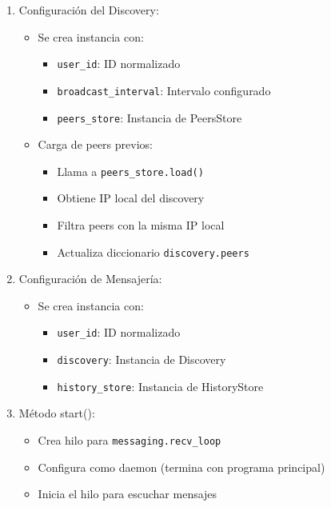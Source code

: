 \documentclass[12pt]{article}
\begin{document}
\begin{enumerate}
    \item Configuración del Discovery:
    \begin{itemize}
        \item Se crea instancia con:
        \begin{itemize}
            \item \texttt{user\_id}: ID normalizado
            \item \texttt{broadcast\_interval}: Intervalo configurado
            \item \texttt{peers\_store}: Instancia de PeersStore
        \end{itemize}
        \item Carga de peers previos:
        \begin{itemize}
            \item Llama a \texttt{peers\_store.load()}
            \item Obtiene IP local del discovery
            \item Filtra peers con la misma IP local
            \item Actualiza diccionario \texttt{discovery.peers}
        \end{itemize}
    \end{itemize}

    \item Configuración de Mensajería:
    \begin{itemize}
        \item Se crea instancia con:
        \begin{itemize}
            \item \texttt{user\_id}: ID normalizado
            \item \texttt{discovery}: Instancia de Discovery
            \item \texttt{history\_store}: Instancia de HistoryStore
        \end{itemize}
    \end{itemize}

    \item Método start():
    \begin{itemize}
        \item Crea hilo para \texttt{messaging.recv\_loop}
        \item Configura como daemon (termina con programa principal)
        \item Inicia el hilo para escuchar mensajes
    \end{itemize}
\end{enumerate}
\end{document}
